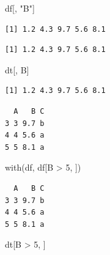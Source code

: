 \documentclass[
]{book}
\newenvironment{Shaded}{\begin{snugshade}}{\end{snugshade}}
\newcommand{\DecValTok}[1]{\textcolor[rgb]{0.00,0.00,0.81}{#1}}
\newcommand{\FunctionTok}[1]{\textcolor[rgb]{0.00,0.00,0.00}{#1}}
\newcommand{\NormalTok}[1]{#1}
\newcommand{\SpecialCharTok}[1]{\textcolor[rgb]{0.00,0.00,0.00}{#1}}
\newcommand{\StringTok}[1]{\textcolor[rgb]{0.31,0.60,0.02}{#1}}
\begin{document}
\begin{Shaded}
\begin{Highlighting}[]
\NormalTok{df[, }\StringTok{"B"}\NormalTok{]}
\end{Highlighting}
\end{Shaded}

\begin{verbatim}
[1] 1.2 4.3 9.7 5.6 8.1
\end{verbatim}

\begin{Shaded}
\end{Shaded}

\begin{verbatim}
[1] 1.2 4.3 9.7 5.6 8.1
\end{verbatim}

\begin{Shaded}
\begin{Highlighting}[]
\NormalTok{dt[, B]}
\end{Highlighting}
\end{Shaded}

\begin{verbatim}
[1] 1.2 4.3 9.7 5.6 8.1
\end{verbatim}

\begin{Shaded}
\end{Shaded}

\begin{verbatim}
  A   B C
3 3 9.7 b
4 4 5.6 a
5 5 8.1 a
\end{verbatim}

\begin{Shaded}
\begin{Highlighting}[]
\FunctionTok{with}\NormalTok{(df, df[B }\SpecialCharTok{\textgreater{}} \DecValTok{5}\NormalTok{, ])}
\end{Highlighting}
\end{Shaded}

\begin{verbatim}
  A   B C
3 3 9.7 b
4 4 5.6 a
5 5 8.1 a
\end{verbatim}

\begin{Shaded}
\begin{Highlighting}[]
\NormalTok{dt[B }\SpecialCharTok{\textgreater{}} \DecValTok{5}\NormalTok{, ]}
\end{Highlighting}
\end{Shaded}
\end{document}
